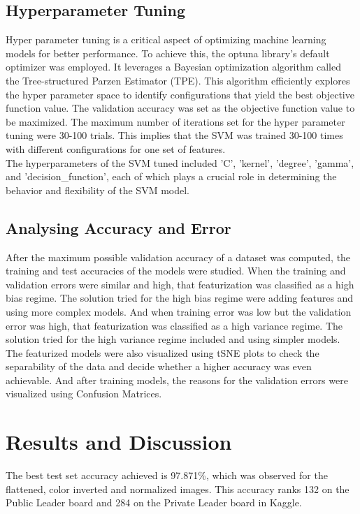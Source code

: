 \documentclass{article}
\begin{document}
\subsection{Hyperparameter Tuning}
Hyper parameter tuning is a critical aspect of optimizing machine learning models for better performance. To achieve this, the optuna library's default optimizer was employed. It leverages a Bayesian optimization algorithm called the Tree-structured Parzen Estimator (TPE). This algorithm efficiently explores the hyper parameter space to identify configurations that yield the best objective function value. The validation accuracy was set as the objective function value to be maximized. The maximum number of iterations set for the hyper parameter tuning were 30-100 trials. This implies that the SVM was trained 30-100 times with different configurations for one set of features. 
\\
The hyperparameters of the SVM tuned included 'C', 'kernel', 'degree', 'gamma', and 'decision\_function', each of which plays a crucial role in determining the behavior and flexibility of the SVM model.

\subsection{Analysing Accuracy and Error}
After the maximum possible validation accuracy of a dataset was computed, the training and test accuracies of the models were studied. When the training and validation errors were similar and high, that featurization was classified as a high bias regime. The solution tried for the high bias regime were adding features and using more complex models. And when training error was low but the validation error was high, that featurization was classified as a high variance regime. The solution tried for the high variance regime included and using simpler models.
\\ 
The featurized models were also visualized using tSNE plots to check the separability of the data and decide whether a higher accuracy was even achievable. And after training models, the reasons for the validation errors were visualized using Confusion Matrices.

\section{Results and Discussion}

The best test set accuracy achieved is 97.871\%, which was observed for the flattened, color inverted and normalized images. This accuracy ranks 132 on the Public Leader board and 284 on the Private Leader board in Kaggle.
\end{document}

